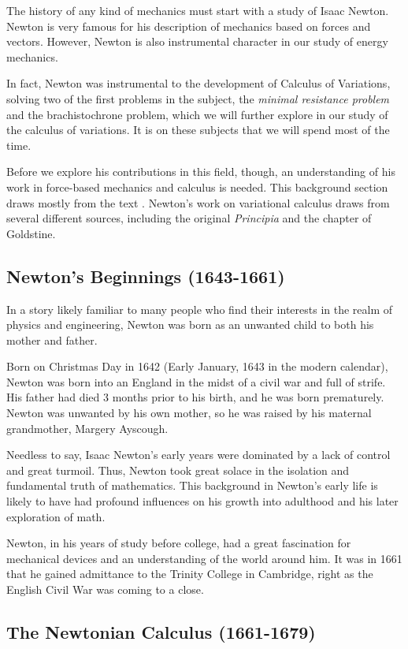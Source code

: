 The history of any kind of mechanics must start with a study of Isaac Newton. Newton is very famous for his description of mechanics based on forces and vectors. However, Newton is also instrumental character in our study of energy mechanics. 

In fact, Newton was instrumental to the development of Calculus of Variations, solving two of the first problems in the subject, the \textit{minimal resistance problem} and the \gls{brachistochrone} problem, which we will further explore in our study of the calculus of variations. It is on these subjects that we will spend most of the time.

Before we explore his contributions in this field, though, an understanding of his work in force-based mechanics and calculus is needed. This background section draws mostly from the text \cite{noauthor_isaac_2017}. Newton's work on variational calculus draws from several different sources, including the original \textit{Principia} and the \cite{goldstine_fermat_1980} chapter of Goldstine.

\subsection{Newton's Beginnings (1643-1661)}
In a story likely familiar to many people who find their interests in the realm of physics and engineering, Newton was born as an unwanted child to both his mother and father.

Born on Christmas Day in 1642 (Early January, 1643 in the modern calendar), Newton was born into an England in the midst of a civil war and full of strife. His father had died 3 months prior to his birth, and he was born prematurely. Newton was unwanted by his own mother, so he was raised by his maternal grandmother, Margery Ayscough.

Needless to say, Isaac Newton's early years were dominated by a lack of control and great turmoil. Thus, Newton took great solace in the isolation and fundamental truth of mathematics. This background in Newton's early life is likely to have had profound influences on his growth into adulthood and his later exploration of math.

Newton, in his years of study before college, had a great fascination for mechanical devices and an understanding of the world around him. It was in 1661 that he gained admittance to the Trinity College in Cambridge, right as the English Civil War was coming to a close.

\subsection{The Newtonian Calculus (1661-1679)}

